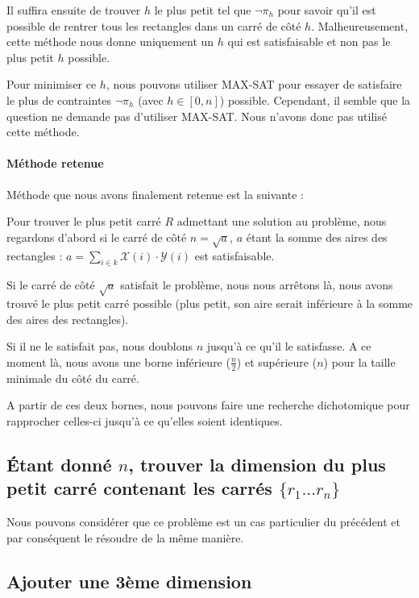 \documentclass[a4paper]{article}
\begin{document}
Il suffira ensuite de trouver $h$ le plus petit tel que $\lnot \pi_{h}$ pour savoir qu'il est possible de rentrer tous les rectangles dans un carré de côté $h$. Malheureusement, cette méthode nous donne uniquement un $h$ qui est satisfaisable et non pas le plus petit $h$ possible.

Pour minimiser ce $h$, nous pouvons utiliser MAX-SAT pour essayer de satisfaire le plus de contraintes $\lnot \pi_h$ (avec $h \in [0, n]$) possible. Cependant, il semble que la question ne demande pas d'utiliser MAX-SAT. Nous n'avons donc pas utilisé cette méthode.

\paragraph{Méthode retenue} Méthode que nous avons finalement retenue est la suivante :

Pour trouver le plus petit carré $R$ admettant une solution au problème, nous regardons d'abord si le carré de côté $n=\sqrt{a}$, $a$ étant la somme des aires des rectangles : $a = \sum_{i \in k} \mathcal{X}(i) \cdot \mathcal{Y}(i)$ est satisfaisable.

Si le carré de côté $\sqrt{a}$ satisfait le problème, nous nous arrêtons là, nous avons trouvé le plus petit carré possible (plus petit, son aire serait inférieure à la somme des aires des rectangles).

Si il ne le satisfait pas, nous doublons $n$ jusqu'à ce qu'il le satisfasse. A ce moment là, nous avons une borne inférieure ($\frac{n}{2}$) et supérieure ($n$) pour la taille minimale du côté du carré.

A partir de ces deux bornes, nous pouvons faire une recherche dichotomique pour rapprocher celles-ci jusqu'à ce qu'elles soient identiques.

\subsection{Étant donné $n$, trouver la dimension du plus petit carré contenant les carrés $\{r_1 \ldots r_n \}$}

Nous pouvons considérer que ce problème est un cas particulier du précédent et par conséquent le résoudre de la même manière.

\subsection{Ajouter une 3ème dimension}
\end{document}
